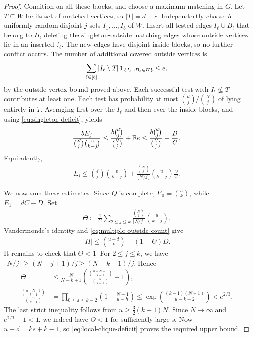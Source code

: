 \begin{proof}
Condition on all these blocks, and choose a maximum matching in $G$. Let $T\subseteq W$ be its set of matched vertices, so $|T|=d-e$. Independently choose $b$ uniformly random disjoint $j$-sets $I_1,\ldots,I_b$ of $W$. Insert all tested edges $I_\ell\cup B_\ell$ that belong to $H$, deleting the singleton-outside matching edges whose outside vertices lie in an inserted $I_\ell$. The new edges have disjoint inside blocks, so no further conflict occurs. The number of additional covered outside vertices is
\begin{align*}
\sum_{\ell\in[b]}|I_\ell\setminus T|\,\mathbf 1_{\{I_\ell\cup B_\ell\in H\}}\le e,
\end{align*}
by the outside-vertex bound proved above. Each successful test with $I_\ell\nsubseteq T$ contributes at least one. Each test has probability at most $\binom dj/\binom Nj$ of lying entirely in $T$. Averaging first over the $I_\ell$ and then over the inside blocks, and using \cref{eq:singleton-deficit}, yields
\begin{align*}
\frac{bE_j}{\binom Nj\binom{u}{k-j}}
\le\frac{b\binom dj}{\binom Nj}+\mathbb E e
\le\frac{b\binom dj}{\binom Nj}+\frac DC.
\end{align*}
Equivalently,
\begin{align}
E_j\le\binom dj\binom{u}{k-j}
+\frac{\binom Nj}{\lfloor N/j\rfloor}\binom{u}{k-j}\frac DC.
\label{eq:multiple-outside-count}
\end{align}

We now sum these estimates. Since $Q$ is complete, $E_0=\binom uk$, while $E_1=dC-D$. Set
\begin{align*}
\Theta\coloneqq\frac1C\sum_{2\le j\le k}
\frac{\binom Nj}{\lfloor N/j\rfloor}\binom{u}{k-j}.
\end{align*}
Vandermonde's identity and \cref{eq:multiple-outside-count} give
\begin{align}
|H|\le\binom{u+d}k-(1-\Theta)D.
\label{eq:local-clique-deficit}
\end{align}
It remains to check that $\Theta<1$. For $2\le j\le k$, we have $\lfloor N/j\rfloor\ge(N-j+1)/j\ge(N-k+1)/j$. Hence
\begin{align*}
\Theta
&\le\frac{N}{N-k+1}\left(\frac{\binom{u+N-1}{k-1}}{\binom{u}{k-1}}-1\right),\\
\frac{\binom{u+N-1}{k-1}}{\binom{u}{k-1}}
&=\prod_{0\le h\le k-2}\left(1+\frac{N-1}{u-h}\right)
\le\exp\left(\frac{(k-1)(N-1)}{u-k+2}\right)<e^{2/3}.
\end{align*}
The last strict inequality follows from $u\ge\frac32(k-1)N$. Since $N\to\infty$ and $e^{2/3}-1<1$, we indeed have $\Theta<1$ for sufficiently large $s$. Now $u+d=ks+k-1$, so \cref{eq:local-clique-deficit} proves the required upper bound.


\end{proof}
